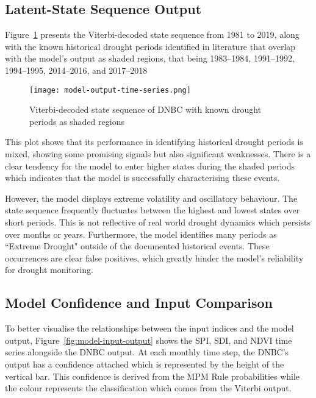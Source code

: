 \subsection{Latent-State Sequence Output}

Figure~\ref{fig:model-output-time-series} presents the Viterbi-decoded state sequence from 1981 to 2019, along with the known historical drought periods identified in literature that overlap with the model's output as shaded regions, that being 1983–1984, 1991–1992, 1994–1995, 2014–2016, and 2017–2018 

\begin{figure}[!h]
    \centering
    \texttt{[image: model-output-time-series.png]}
    \caption[DNBC State Sequence]{Viterbi-decoded state sequence of DNBC with known drought periods as shaded regions }
    \label{fig:model-output-time-series}
\end{figure}

This plot shows that its performance in identifying historical drought periods is mixed, showing some promising signals but also significant weaknesses. There is a clear tendency for the model to enter higher states during the shaded periods which indicates that the model is successfully characterising these events.

However, the model displays extreme volatility and oscillatory behaviour. The state sequence frequently fluctuates between the highest and lowest states over short periods. This is not reflective of real world drought dynamics which persists over months or years. Furthermore, the model identifies many periods as ``Extreme Drought" outside of the documented historical events. These occurrences are clear false positives, which greatly hinder the model's reliability for drought monitoring.

\subsection{Model Confidence and Input Comparison}

To better visualise the relationships between the input indices and the model output, Figure~\ref{fig:model-input-output} shows the SPI, SDI, and NDVI time series alongside the DNBC output. At each monthly time step, the DNBC's output has a confidence attached which is represented by the height of the vertical bar. This confidence is derived from the MPM Rule probabilities while the colour represents the classification which comes from the Viterbi output.

